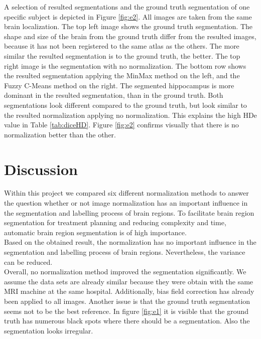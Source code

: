 \documentclass[article]{IEEEtran}
\begin{document}
\begin{multicols}{2}

	A selection of resulted segmentations and the ground truth segmentation of one specific subject is depicted in Figure \ref{fig:e2}.
	All images are taken from the same brain localization.
	The top left image shows the ground truth segmentation. 
	The shape and size of the brain from the ground truth differ from the resulted images, because it has not been registered to the same atlas as the others.
	The more similar the resulted segmentation is to the ground truth, the better.
	The top right image is the segmentation with no normalization.
	The bottom row shows the resulted segmentation applying the MinMax method on the left, and the Fuzzy C-Means method on the right. 
	The segmented hippocampus is more dominant in the resulted segmentation, than in the ground truth.
	Both segmentations look different compared to the ground truth, but look similar to the resulted normalization applying no normalization. 
	This explains the high HDe value in Table \ref{tab:diceHD}. 
	Figure \ref{fig:e2} confirms visually that there is no normalization better than the other.
	




\section{Discussion}
	Within this project we compared six different normalization methods to answer the question whether or not image normalization has an important influence in the segmentation and labelling process of brain regions.
	To facilitate brain region segmentation for treatment planning and reducing complexity and time, automatic brain region segmentation is of high importance. \\
	
	Based on the obtained result, the normalization has no important influence in the segmentation and labelling process of brain regions. 
	Nevertheless, the variance can be reduced. \\
	
	Overall, no normalization method improved the segmentation significantly.
	We assume the data sets are already similar because they were obtain with the same MRI machine at the same hospital. 
	Additionally, bias field correction has already been applied to all images. 
	Another issue is that the ground truth segmentation seems not to be the best reference. 
	In figure \ref{fig:e1} it is visible that the ground truth has numerous black spots where there should be a segmentation. Also the segmentation looks irregular.\\
	

\end{multicols}
\end{document}
